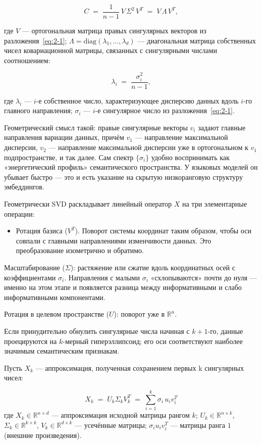 \documentclass[a4paper, 12pt, oneside, openany]{article}
\begin{document}
\[
C \;=\; \frac{1}{n - 1}\, V\, \Sigma^{2}\, V^{T} \;=\; V\, \Lambda\, V^{T},
\]

где $V$ --- ортогональная матрица правых сингулярных векторов из разложения~\eqref{eq:2-1}; $\Lambda = \mathrm{diag}(\lambda_{1}, \ldots, \lambda_{d})$ --- диагональная матрица собственных чисел ковариационной матрицы, связанных с сингулярными числами соотношением:

\[
\lambda_{i} \;=\; \frac{\sigma_{i}^{2}}{n - 1},
\]

где $\lambda_{i}$ --- $i$-е собственное число, характеризующее дисперсию данных вдоль $i$-го главного направления; $\sigma_{i}$ --- $i$-е сингулярное число из разложения~\eqref{eq:2-1}.

Геометрический смысл такой: правые сингулярные векторы $v_i$ задают главные направления вариации данных, причём $v_1$ — направление максимальной дисперсии, $v_2$ — направление максимальной дисперсии уже в ортогональном к $v_1$ подпространстве, и так далее. Сам спектр $\{\sigma_i\}$ удобно воспринимать как «энергетический профиль» семантического пространства. У языковых моделей он убывает быстро — это и есть указание на скрытую низкоранговую структуру эмбеддингов.

Геометрически SVD раскладывает линейный оператор $X$ на три элементарные операции:
\begin{itemize}
	\item
	Ротация базиса ($V^{T}$). Поворот системы координат таким образом, чтобы оси совпали с главными направлениями изменчивости данных. Это преобразование изометрично и обратимо.
\end{itemize}

Масштабирование ($\Sigma$): растяжение или сжатие вдоль координатных осей с коэффициентами $\sigma_i$. Направления с малыми $\sigma_i$ «схлопываются» почти до нуля — именно на этом этапе и появляется разница между информативными и слабо информативными компонентами.

Ротация в целевом пространстве ($U$): поворот уже в $\mathbb{R}^n$.

Если принудительно обнулить сингулярные числа начиная с $k+1$-го, данные проецируются на $k$-мерный гиперэллипсоид; его оси соответствуют наиболее значимым семантическим признакам.

Пусть \(X_{k}\) --- аппроксимация, полученная сохранением первых k сингулярных чисел:

\begin{equation}
	X_{k} \;=\; U_{k} \Sigma_{k} V_{k}^{T} \;=\; \sum_{i = 1}^{k} \sigma_{i}\, u_{i} v_{i}^{T}
	\label{eq:2-3}
\end{equation}
где $X_{k} \in \mathbb{R}^{n \times d}$ --- аппроксимация исходной матрицы рангом $k$; $U_{k} \in \mathbb{R}^{n \times k}$, $\Sigma_{k} \in \mathbb{R}^{k \times k}$, $V_{k} \in \mathbb{R}^{d \times k}$ --- усечённые матрицы; $\sigma_{i} u_{i} v_{i}^{T}$ --- матрицы ранга $1$ (внешние произведения).
\end{document}
